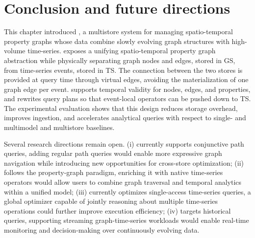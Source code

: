 \section{Conclusion and future directions}\label{sec:conclusion}

This chapter introduced \ourapproach, a multistore system for managing spatio-temporal property graphs whose data combine slowly evolving graph structures with high-volume time-series.
\ourapproach exposes a unifying spatio-temporal property graph abstraction while physically separating graph nodes and edges, stored in GS, from time-series events, stored in TS.
The connection between the two stores is provided at query time through virtual edges, avoiding the materialization of one graph edge per event.
\ourapproach supports temporal validity for nodes, edges, and properties, and rewrites query plans so that event-local operators can be pushed down to TS.
The experimental evaluation shows that this design reduces storage overhead, improves ingestion, and accelerates analytical queries with respect to single- and multimodel and multistore baselines.

Several research directions remain open.
\ourapproach 
(i) currently supports conjunctive path queries, adding regular path queries would enable more expressive graph navigation while introducing new opportunities for cross-store optimization;
(ii) follows the property-graph paradigm, enriching it with native time-series operators would allow users to combine graph traversal and temporal analytics within a unified model;
(iii) currently optimizes single-access time-series queries, a global optimizer capable of jointly reasoning about multiple time-series operations could further improve execution efficiency;
(iv) targets historical queries, supporting streaming graph-time-series workloads would enable real-time monitoring and decision-making over continuously evolving data.


